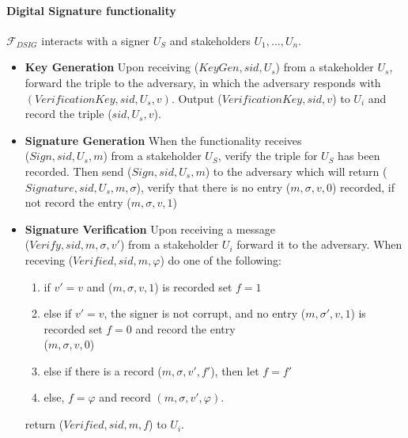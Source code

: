 \paragraph{Digital Signature functionality} $\mathcal{F}_{DSIG}$ interacts with a signer $U_S$ and stakeholders $U_1, \dots, U_n$. 
\begin{itemize}
    \item \textbf{Key Generation} Upon receiving ($KeyGen, sid, U_s$) from a stakeholder $U_s$, forward the triple to the adversary, in which the adversary responds with $(VerificationKey, sid, U_s, v)$. Output ($VerificationKey, sid, v$) to $U_i$ and record the triple ($sid, U_s, v$).
    \item \textbf{Signature Generation} When the functionality receives \\ ($Sign, sid, U_s, m$) from a stakeholder $U_S$, verify the triple for $U_S$ has been recorded. Then send ($Sign, sid, U_s, m$) to the adversary which will return ($Signature, sid , U_s, m, \sigma$), verify that there is no entry ($m, \sigma, v, 0$) recorded, if not record the entry ($m, \sigma, v, 1$)
    \item \textbf{Signature Verification} Upon receiving a message \\ ($Verify, sid, m, \sigma, v'$) from a stakeholder $U_i$ forward it to the adversary. When receving ($Verified, sid, m, \varphi$) do one of the following:
    \begin{enumerate}
        \item if $v' = v$ and ($m, \sigma, v, 1$) is recorded set $f = 1$ 
        \item else if $v' = v$, the signer is not corrupt, and no entry ($m, \sigma', v, 1$) is recorded set $f = 0$ and record the entry \\ ($m, \sigma, v, 0$)
        \item else if there is a record ($m, \sigma, v', f'$), then let $f = f'$
        \item else, $f = \varphi$ and record $(m, \sigma, v', \varphi)$.
    \end{enumerate}
    return ($Verified, sid, m, f$) to $U_i$.
\end{itemize}

